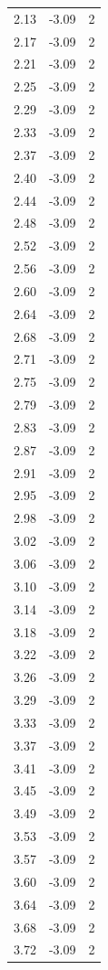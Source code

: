 \begin{longtable}{lrr}
  2.13 & -3.09 & 2 \\
  2.17 & -3.09 & 2 \\
  2.21 & -3.09 & 2 \\
  2.25 & -3.09 & 2 \\
  2.29 & -3.09 & 2 \\
  2.33 & -3.09 & 2 \\
  2.37 & -3.09 & 2 \\
  2.40 & -3.09 & 2 \\
  2.44 & -3.09 & 2 \\
  2.48 & -3.09 & 2 \\
  2.52 & -3.09 & 2 \\
  2.56 & -3.09 & 2 \\
  2.60 & -3.09 & 2 \\
  2.64 & -3.09 & 2 \\
  2.68 & -3.09 & 2 \\
  2.71 & -3.09 & 2 \\
  2.75 & -3.09 & 2 \\
  2.79 & -3.09 & 2 \\
  2.83 & -3.09 & 2 \\
  2.87 & -3.09 & 2 \\
  2.91 & -3.09 & 2 \\
  2.95 & -3.09 & 2 \\
  2.98 & -3.09 & 2 \\
  3.02 & -3.09 & 2 \\
  3.06 & -3.09 & 2 \\
  3.10 & -3.09 & 2 \\
  3.14 & -3.09 & 2 \\
  3.18 & -3.09 & 2 \\
  3.22 & -3.09 & 2 \\
  3.26 & -3.09 & 2 \\
  3.29 & -3.09 & 2 \\
  3.33 & -3.09 & 2 \\
  3.37 & -3.09 & 2 \\
  3.41 & -3.09 & 2 \\
  3.45 & -3.09 & 2 \\
  3.49 & -3.09 & 2 \\
  3.53 & -3.09 & 2 \\
  3.57 & -3.09 & 2 \\
  3.60 & -3.09 & 2 \\
  3.64 & -3.09 & 2 \\
  3.68 & -3.09 & 2 \\
  3.72 & -3.09 & 2 \\

\end{longtable}
